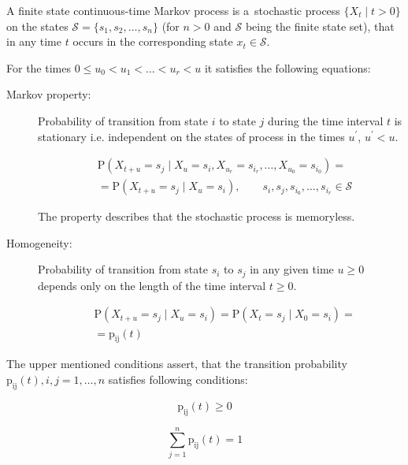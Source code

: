 \documentclass[thesis=M,english]{FITthesis}[2012/10/20]
\begin{document}
A finite state continuous-time Markov process is a~stochastic process $\{ X_t \mid t > 0\}$ on the states $\mathcal{S} = \{ s_1, s_2, \dots, s_n \}$  (for $n>0$ and $\mathcal{S}$ being the finite state set), that in any time $t$  occurs in the corresponding state $x_t \in \mathcal{S}$. 

For the times $0 \leq u_0 < u_1 < \dots < u_r < u$ it satisfies the following equations: 
\begin{description}
\item [Markov property:] Probability of transition from state $i$ to state $j$ during the time interval $t$ is stationary i.e. independent on the states of process in the times $u^{'}$, $ u^{'} < u$.  
    
\begin{equation}
\begin{aligned}
& \mathrm{P}( X_{t+u} = s_j \mid X_u = s_i, X_{u_r} = s_{i_r}, \dots , X_{u_0} = s_{i_0} ) = \\ 
& = \mathrm{P}( X_{t+u} = s_j \mid X_u = s_i ), \qquad s_i,s_j,s_{i_0}, \dots ,s_{i_r} \in \mathcal{S} 
\end{aligned}
\end{equation}

The property describes that the stochastic process is memoryless.

\item [Homogeneity:] Probability of transition from state $s_i$ to $s_j$ in any given time $u \geq 0$ depends only on the length of the time interval $t \geq 0$. 

\begin{equation}
\begin{aligned}
& \mathrm{P}( X_{t+u} = s_j \mid X_u = s_i ) = \mathrm{P}( X_t = s_j \mid X_0 = s_i ) = \\
& = \mathrm{p_{ij}}(t)
\end{aligned}
\end{equation}

\end{description}
 

The upper mentioned conditions assert, that the transition probability $\mathrm{p_{ij}}(t), i,j = 1,\dots,n$ satisfies following conditions: \cite{Ka81}


\begin{equation}
\mathrm{p_{ij}}(t) \geq 0
\end{equation}

\begin{equation}
\sum_{j = 1}^n \mathrm{p_{ij}}(t) = 1
\end{equation}
\end{document}
